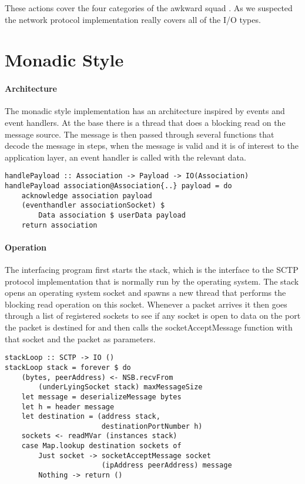 These actions cover the four categories of the awkward squad \cite{jones_tackling_2009}. 
As we suspected the network protocol implementation really covers all of the I/O types.
\section{Monadic Style}
\paragraph{Architecture}
The monadic style implementation has an architecture inspired by events and event handlers. At the base there is a thread that does a blocking read on the message source. The message is then passed through several functions that decode the message in steps, when the message is valid and it is of interest to the application layer, an event handler is called with the relevant data.

\begin{lstlisting}[caption={The eventhandler is called when a payload is received}]
handlePayload :: Association -> Payload -> IO(Association)
handlePayload association@Association{..} payload = do 
    acknowledge association payload
    (eventhandler associationSocket) $
	    Data association $ userData payload
    return association
\end{lstlisting}

\paragraph{Operation}
The interfacing program first starts the stack, which is the interface to the SCTP protocol implementation that is normally run by the operating system. The stack opens an operating system socket and spawns a new thread that performs the blocking read operation on this socket. Whenever a packet arrives it then goes through a list of registered sockets to see if any socket is open to data on the port the packet is destined for and then calls the socketAcceptMessage function with that socket and the packet as parameters.

\begin{lstlisting}[caption={The stack loop}]
stackLoop :: SCTP -> IO ()
stackLoop stack = forever $ do
    (bytes, peerAddress) <- NSB.recvFrom 
        (underLyingSocket stack) maxMessageSize
    let message = deserializeMessage bytes
    let h = header message
    let destination = (address stack,
                       destinationPortNumber h)
    sockets <- readMVar (instances stack)
    case Map.lookup destination sockets of
        Just socket -> socketAcceptMessage socket
                       (ipAddress peerAddress) message
        Nothing -> return ()
\end{lstlisting}

